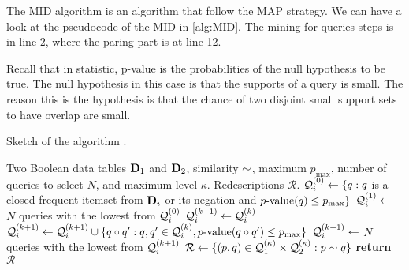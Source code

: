 The \ac{MID} algorithm is an algorithm that follow the \ac{MAP} strategy.
We can have a look at the pseudocode of the \acl{MID} in \autoref{alg:MID}.
The mining for queries steps is in line 2, where the paring part is at line 12.

Recall that in statistic, p-value is the probabilities of the null hypothesis to be true.
The null hypothesis in this case is that the supports of a query is small.
The reason this is the hypothesis is that the chance of two disjoint small support sets to have overlap are small.

\begin{algorithm}[tb]
    \caption{Sketch of the \algMID{} algorithm \citep{galbrun2018redescription}.}
      \label{alg:MID}
    \begin{algorithmic}[1]
    \small
      \Require Two Boolean data tables $\mathbf{D}_1$ and $\mathbf{D}_2$, similarity $\sim$, maximum \pvalue{} $p_{\max}$, number of queries to select $N$, and maximum level $\kappa$.
      \Ensure Redescriptions $\mathcal{R}$.
       \State $\mathcal{Q}^{(0)}_i \gets \{ q : q$ is a closed frequent itemset from $\mathbf{D}_i$ or its negation and $ \pvalue(\query) \leq p_{\max}\}$ \label{alg:MID:mine} %
       \State $\mathcal{Q}^{(1)}_i \gets$  $N$ queries with the lowest \pvalue from $\mathcal{Q}^{(0)}_i$ 
         \State $\mathcal{Q}^{(k+1)}_i \gets \mathcal{Q}^{(k)}_i$
            \State $\Queries^{(k+1)}_i \gets \Queries^{(k+1)}_i \cup \{ \query \lop \query' : \query, \query' \in \Queries^{(k)}_i, \pvalue(\query \lop \query') \leq p_{\max}\}$ \label{alg:MID:combine}
      \EndFor
       \State $\mathcal{Q}^{(k+1)}_i \gets$  $N$ queries with the lowest \pvalue from $\mathcal{Q}^{(k+1)}_i$ \label{alg:MID:filter}
      \EndFor
      \EndFor
      \State $\mathcal{R} \gets \{(p, q) \in \mathcal{Q}^{(\kappa)}_1 \times \mathcal{Q}^{(\kappa)}_2  : p \sim q\}$ \label{alg:MID:pair} %
      \State \textbf{return} $\mathcal{R}$
    \end{algorithmic}
\end{algorithm}

